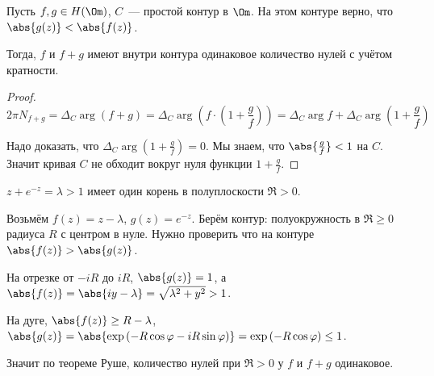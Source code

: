 \begin{theorem}[Руше]

    Пусть $f, g \in H(\Om)$,
    $C$~--- простой контур в $\Om$.
    На этом контуре верно, что $\abs{g(z)} < \abs{f(z)}$.

    Тогда, $f$ и $f+g$ имеют внутри контура одинаковое количество
    нулей с учётом кратности.
\end{theorem}

\begin{proof}

    \[
        2\pi N_{f+g} = \Delta_C \arg(f+g)
        = \Delta_C \arg\left(f \cdot \left(1 + \frac{g}{f}\right)\right)
        = \Delta_C \arg f + \Delta_C \arg \left(1 + \frac{g}{f}\right)
    \]

    Надо доказать, что $\Delta_C \arg \left(1 + \frac gf\right) = 0$.
    Мы знаем, что $\abs{\frac gf} < 1$ на $C$.
    Значит кривая $C$ не обходит вокруг нуля функции $1 + \frac gf$.
\end{proof}

\begin{example}
    $z + e^{-z} = \lambda > 1$ имеет один корень в
    полуплоскости $\Re > 0$.

    Возьмём $f(z) = z - \lambda$, $g(z) = e^{-z}$.
    Берём контур: полуокружность в $\Re \ge 0$
    радиуса $R$ с центром в нуле. Нужно проверить что
    на контуре $\abs{f(z)} > \abs{g(z)}$.

    На отрезке от $-iR$ до $iR$, $\abs{g(z)} = 1$,
    а $\abs{f(z)} = \abs{iy - \lambda} = \sqrt{\lambda^2 + y^2} > 1$.

    На дуге, $\abs{f(z)} \ge R - \lambda$,
    $\abs{g(z)} = \abs{\exp \left(-R\cos \varphi -iR\sin \varphi\right) }
        = \exp\left(-R\cos\varphi\right) \le 1$.

    Значит по теореме Руше, количество нулей при $\Re > 0$
    у $f$ и $f+g$ одинаковое.
\end{example}
